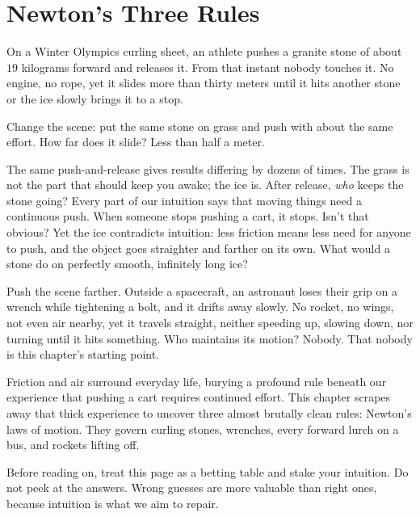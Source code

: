 \chapter{Newton's Three Rules}


\begin{mainline}
On a Winter Olympics curling sheet, an athlete pushes a granite stone of about \(19\) kilograms forward and releases it. From that instant nobody touches it. No engine, no rope, yet it slides more than thirty meters until it hits another stone or the ice slowly brings it to a stop.

Change the scene: put the same stone on grass and push with about the same effort. How far does it slide? Less than half a meter.

The same push-and-release gives results differing by dozens of times. The grass is not the part that should keep you awake; the ice is. After release, \emph{who} keeps the stone going? Every part of our intuition says that moving things need a continuous push. When someone stops pushing a cart, it stops. Isn't that obvious? Yet the ice contradicts intuition: less friction means less need for anyone to push, and the object goes straighter and farther on its own. What would a stone do on perfectly smooth, infinitely long ice?

Push the scene farther. Outside a spacecraft, an astronaut loses their grip on a wrench while tightening a bolt, and it drifts away slowly. No rocket, no wings, not even air nearby, yet it travels straight, neither speeding up, slowing down, nor turning until it hits something. Who maintains its motion? Nobody. That nobody is this chapter's starting point.

Friction and air surround everyday life, burying a profound rule beneath our experience that pushing a cart requires continued effort. This chapter scrapes away that thick experience to uncover three almost brutally clean rules: Newton's laws of motion. They govern curling stones, wrenches, every forward lurch on a bus, and rockets lifting off.
\end{mainline}


Before reading on, treat this page as a betting table and stake your intuition. Do not peek at the answers. Wrong guesses are more valuable than right ones, because intuition is what we aim to repair.

